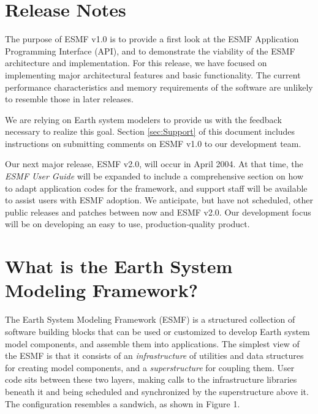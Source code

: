 
\section{Release Notes}

The purpose of ESMF v1.0 is to provide a first look at the ESMF
Application Programming Interface (API), and to demonstrate the viability 
of the ESMF architecture and implementation.  For this release, we have focused 
on implementing major architectural features and basic functionality.  The 
current performance characteristics and memory requirements of the software 
are unlikely to resemble those in later releases.

We are relying on Earth system modelers to provide us with the feedback necessary 
to realize this goal.  Section \ref{sec:Support} of this document includes 
instructions on submitting comments on ESMF v1.0 to our development team.

Our next major release, ESMF v2.0, will occur in April 2004.  At that time, 
the {\it ESMF User Guide} will be expanded to include a comprehensive section 
on how to adapt application codes for the framework, and support staff will be 
available to assist users with ESMF adoption.  We anticipate, but have 
not scheduled, other public releases and patches between now and ESMF v2.0.  
Our development focus will be on developing an easy to use, production-quality 
product.  

\section{What is the Earth System Modeling Framework?}

The Earth System Modeling Framework (ESMF) is a structured collection of 
software building blocks that can be used or customized to develop 
Earth system model components, and assemble them into applications.  
The simplest view of the ESMF is that it consists of an
{\it infrastructure} of utilities and data structures for creating 
model components, and a {\it superstructure} for coupling them.  
User code sits between these two layers, making calls to the infrastructure
libraries beneath it and being scheduled and synchronized by the 
superstructure above it.  The configuration resembles a sandwich, as
shown in Figure 1.

